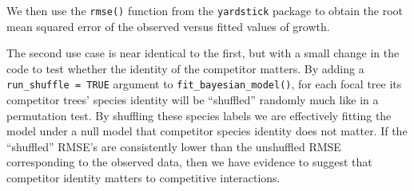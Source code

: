 \documentclass[12pt]{article}
\newenvironment{Shaded}{\begin{snugshade}}{\end{snugshade}}
\newcommand{\CommentTok}[1]{\textcolor[rgb]{0.56,0.35,0.01}{\textit{#1}}}
\newcommand{\DataTypeTok}[1]{\textcolor[rgb]{0.13,0.29,0.53}{#1}}
\newcommand{\KeywordTok}[1]{\textcolor[rgb]{0.13,0.29,0.53}{\textbf{#1}}}
\newcommand{\NormalTok}[1]{#1}
\newcommand{\OperatorTok}[1]{\textcolor[rgb]{0.81,0.36,0.00}{\textbf{#1}}}
\newcommand{\OtherTok}[1]{\textcolor[rgb]{0.56,0.35,0.01}{#1}}
\newcommand{\StringTok}[1]{\textcolor[rgb]{0.31,0.60,0.02}{#1}}
\begin{document}
We then use the \texttt{rmse()} function from the \texttt{yardstick}
package to obtain the root mean squared error of the observed versus
fitted values of growth.

\begin{Shaded}
\end{Shaded}

The second use case is near identical to the first, but with a small
change in the code to test whether the identity of the competitor
matters. By adding a \texttt{run\_shuffle\ =\ TRUE} argument to
\texttt{fit\_bayesian\_model()}, for each focal tree its competitor
trees' species identity will be ``shuffled'' randomly much like in a
permutation test. By shuffling these species labels we are effectively
fitting the model under a null model that competitor species identity
does not matter. If the ``shuffled'' RMSE's are consistently lower than
the unshuffled RMSE corresponding to the observed data, then we have
evidence to suggest that competitor identity matters to competitive
interactions.

\begin{Shaded}
\end{Shaded}

\begin{Shaded}
\end{Shaded}
\end{document}
